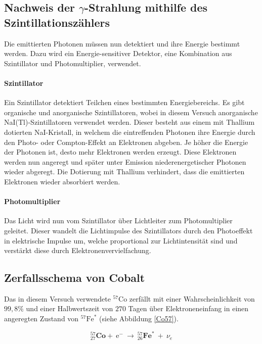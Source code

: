  \subsection{Nachweis der $\gamma$-Strahlung mithilfe des Szintillationszählers}
 Die emittierten Photonen müssen nun detektiert und ihre Energie bestimmt werden. Dazu wird ein Energie-sensitiver Detektor, eine Kombination aus Szintillator und Photomultiplier, verwendet.
 \paragraph{Szintillator} Ein Szintillator detektiert Teilchen eines bestimmten Energiebereichs. Es gibt organische und anorganische Szintillatoren, wobei in diesem Versuch anorganische NaI(Tl)-Szintillatoren verwendet werden. Dieser besteht aus einem mit Thallium dotierten NaI-Kristall, in welchem die eintreffenden Photonen ihre Energie durch den Photo- oder Compton-Effekt an Elektronen abgeben. Je höher die Energie der Photonen ist, desto mehr Elektronen werden erzeugt. Diese Elektronen werden nun angeregt und später unter Emission  niederenergetischer Photonen wieder abgeregt. Die Dotierung mit Thallium verhindert, dass die emittierten Elektronen wieder absorbiert werden.
 \paragraph{Photomultiplier}
 Das Licht wird nun vom Szintillator über Lichtleiter zum Photomultiplier geleitet. Dieser wandelt die Lichtimpulse des Szintillators durch den Photoeffekt in elektrische Impulse um, welche proportional zur Lichtintensität sind und verstärkt diese durch Elektronenvervielfachung.
 
 

\subsection{Zerfallsschema von Cobalt}

Das in diesem Versuch verwendete $^{57}$Co zerfällt mit einer Wahrscheinlichkeit von $99,8\%$ und einer Halbwertszeit von $270$ Tagen über Elektroneneinfang in einen angeregten Zustand von $^{57}\mathrm{Fe}^*$ (siehe Abbildung \ref{Co57}).

\[ ^{57}_{27}\mathrm{\textbf{Co}} +\ \mathrm{e}^-\ \longrightarrow\ ^{57}_{26}\mathrm{\textbf{Fe}}^*\ +\ \nu_e\]



